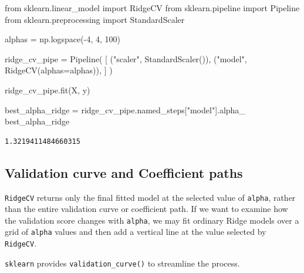 \documentclass[
  letterpaper,
  DIV=11,
  numbers=noendperiod]{scrreprt}
\newenvironment{Shaded}{\begin{snugshade}}{\end{snugshade}}
\newcommand{\DecValTok}[1]{\textcolor[rgb]{0.68,0.00,0.00}{#1}}
\newcommand{\ImportTok}[1]{\textcolor[rgb]{0.00,0.46,0.62}{#1}}
\newcommand{\NormalTok}[1]{\textcolor[rgb]{0.00,0.23,0.31}{#1}}
\newcommand{\OperatorTok}[1]{\textcolor[rgb]{0.37,0.37,0.37}{#1}}
\newcommand{\StringTok}[1]{\textcolor[rgb]{0.13,0.47,0.30}{#1}}
\theoremstyle{definition}
\theoremstyle{definition}
\theoremstyle{plain}
\theoremstyle{plain}
\theoremstyle{remark}
\begin{document}
\begin{Shaded}
\begin{Highlighting}[]
\ImportTok{from}\NormalTok{ sklearn.linear\_model }\ImportTok{import}\NormalTok{ RidgeCV}
\ImportTok{from}\NormalTok{ sklearn.pipeline }\ImportTok{import}\NormalTok{ Pipeline}
\ImportTok{from}\NormalTok{ sklearn.preprocessing }\ImportTok{import}\NormalTok{ StandardScaler}

\NormalTok{alphas }\OperatorTok{=}\NormalTok{ np.logspace(}\OperatorTok{{-}}\DecValTok{4}\NormalTok{, }\DecValTok{4}\NormalTok{, }\DecValTok{100}\NormalTok{)}

\NormalTok{ridge\_cv\_pipe }\OperatorTok{=}\NormalTok{ Pipeline(}
\NormalTok{    [}
\NormalTok{        (}\StringTok{"scaler"}\NormalTok{, StandardScaler()),}
\NormalTok{        (}\StringTok{"model"}\NormalTok{, RidgeCV(alphas}\OperatorTok{=}\NormalTok{alphas)),}
\NormalTok{    ]}
\NormalTok{)}

\NormalTok{ridge\_cv\_pipe.fit(X, y)}

\NormalTok{best\_alpha\_ridge }\OperatorTok{=}\NormalTok{ ridge\_cv\_pipe.named\_steps[}\StringTok{"model"}\NormalTok{].alpha\_}
\NormalTok{best\_alpha\_ridge}
\end{Highlighting}
\end{Shaded}

\begin{verbatim}
1.3219411484660315
\end{verbatim}

\subsection{Validation curve and Coefficient
paths}\label{validation-curve-and-coefficient-paths}

\texttt{RidgeCV} returns only the final fitted model at the selected
value of \texttt{alpha}, rather than the entire validation curve or
coefficient path. If we want to examine how the validation score changes
with \texttt{alpha}, we may fit ordinary Ridge models over a grid of
\texttt{alpha} values and then add a vertical line at the value selected
by \texttt{RidgeCV}.

\texttt{sklearn} provides \texttt{validation\_curve()} to streamline the
process.
\end{document}

